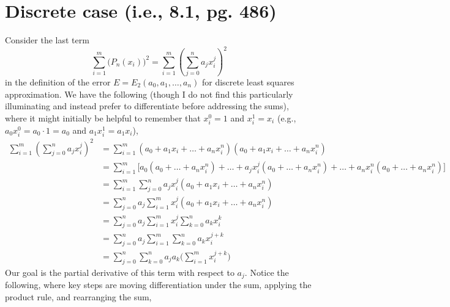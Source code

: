 \documentclass{article}
\begin{document}
\pagestyle{fancy}

\section*{Discrete case (i.e., 8.1, pg. 486)}
Consider the last term \[\sum_{i=1}^m\Big(P_n(x_i)\Big)^2 = \sum_{i=1}^m \left(\sum_{j=0}^n a_j x_i^j\right)^2\] in the definition of the error \(E = E_2(a_0, a_1, \dots, a_n)\) for discrete least squares approximation. We have the following (though I do not find this particularly illuminating and instead prefer to differentiate before addressing the sums), where it might initially be helpful to remember that \(x_i^0 = 1\)  and \(x_i^1 = x_i\) (e.g., \(a_0 x_i^0 = a_0\cdot1 =a_0\) and \(a_1 x_i^1 = a_1x_i\)), 
\begin{align*}
 \sum_{i=1}^m \left(\sum_{j=0}^n a_j x_i^j\right)^2 & = \sum_{i=1}^m (a_0 + a_1x_i+ \dots + a_n x_i^n)(a_0  + a_1x_i + \dots + a_n x_i^n)\\
 & =  \sum_{i=1}^m \Big[a_0  (a_0  + \dots + a_n x_i^n) + \dots  + a_jx_i^j(a_0  + \dots + a_n x_i^n) + \dots + a_n x_i^n(a_0  + \dots + a_n x_i^n)\Big]\\
 & =  \sum_{i=1}^m  \sum_{j=0}^n a_jx_i^j(a_0 + a_1x_i + \dots + a_n x_i^n)\\
 & =   \sum_{j=0}^n a_j  \sum_{i=1}^m x_i^j(a_0 + a_1x_i + \dots + a_n x_i^n)\\
 & =   \sum_{j=0}^n a_j  \sum_{i=1}^m x_i^j \sum_{k=0}^n a_k x_i^k\\
 & =   \sum_{j=0}^n a_j  \sum_{i=1}^m \sum_{k=0}^n a_k x_i^{j+k}\\
 & = \sum_{j=0}^n\sum_{k=0}^n a_ja_k\Big(\sum_{i=1}^m x_i^{j+k}\Big)
 \end{align*}
Our goal is the partial derivative of this term with respect to \(a_j\). Notice the following, where key steps are moving differentiation under the sum, applying the product rule, and rearranging the sum,
\end{document}
